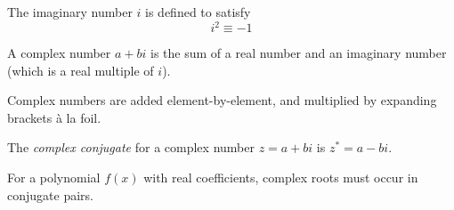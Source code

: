 \documentclass[../main.tex]{subfile}
\begin{document}

The imaginary number $i$ is defined to satisfy $$\boxed{i^2 \equiv -1}$$

A complex number $a + bi$ is the sum of a real number and an imaginary number (which is a real multiple of $i$).

Complex numbers are added element-by-element, and multiplied by expanding brackets à la foil.

The \textit{complex conjugate} for a complex number $z = a + bi$ is $z^* = a - bi$.

For a polynomial $f(x)$ with real coefficients, complex roots must occur in conjugate pairs.
\end{document}

